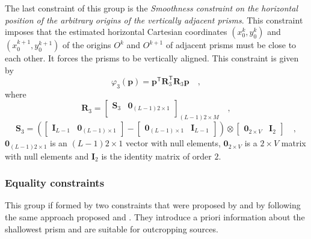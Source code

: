 The last constraint of this group is the \textit{Smoothness constraint on the horizontal position of 
the arbitrary origins of the vertically adjacent prisms}. This constraint imposes that the estimated horizontal 
Cartesian coordinates $(x_{0}^{k}, y_{0}^{k})$ and $(x_{0}^{k+1}, y_{0}^{k+1})$ of the origins $O^{k}$ and $O^{k+1}$ 
of adjacent prisms must be close to each other. It forces the prisms to be vertically aligned. This constraint 
is given by
\begin{equation}
\varphi_{3}(\mathbf{p}) = \mathbf{p}^{\mathsf{T}} \mathbf{R}^{\mathsf{T}}_{3}\mathbf{R}_{3}\mathbf{p} \quad ,
\label{eq:phi3}
\end{equation}
where 
\begin{equation}
\mathbf{R}_{3} = 
\begin{bmatrix}
\mathbf{S}_{3} & \mathbf{0}_{(L-1)2 \times 1} \\
\end{bmatrix}_{(L-1)2 \times M} \quad ,
\label{eq:R3-matrix}
\end{equation}
\begin{equation}
\mathbf{S}_{3} =
\left( 
\begin{bmatrix} \mathbf{I}_{L-1} & \mathbf{0}_{(L-1) \times 1} \end{bmatrix} -
\begin{bmatrix} \mathbf{0}_{(L-1) \times 1} & \mathbf{I}_{L-1} \end{bmatrix} 
\right) \otimes 
\begin{bmatrix} \mathbf{0}_{2 \times V} & \mathbf{I}_{2} \end{bmatrix} \quad ,
\label{eq:S3-matrix}
\end{equation}
$\mathbf{0}_{(L-1)2 \times 1}$ is an $(L-1)2 \times 1$ vector with null elements,
$\mathbf{0}_{2 \times V}$ is a $2 \times V$ matrix with null elements and 
$\mathbf{I}_{2}$ is the identity matrix of order $2$.

\subsubsection{Equality constraints}

This group if formed by two constraints that were proposed by \citet{oliveirajr-etal2011} and 
\citet{oliveirajr-barbosa2013} by following the same approach proposed \citet{barbosa-etal1997} and 
\citet{barbosa-etal1999}. They introduce a priori information about the shallowest prism and are 
suitable for outcropping sources.

